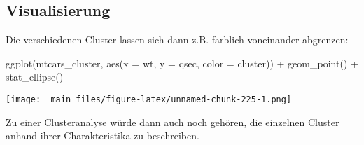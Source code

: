 \documentclass[
  ngerman,
]{article}
\newenvironment{Shaded}{\begin{snugshade}}{\end{snugshade}}
\newcommand{\AttributeTok}[1]{\textcolor[rgb]{0.77,0.63,0.00}{#1}}
\newcommand{\FunctionTok}[1]{\textcolor[rgb]{0.00,0.00,0.00}{#1}}
\newcommand{\NormalTok}[1]{#1}
\newcommand{\SpecialCharTok}[1]{\textcolor[rgb]{0.00,0.00,0.00}{#1}}
\begin{document}
\hypertarget{visualisierung-1}{%
\subsection{Visualisierung}\label{visualisierung-1}}

Die verschiedenen Cluster lassen sich dann z.B. farblich voneinander abgrenzen:

\begin{Shaded}
\begin{Highlighting}[]
\FunctionTok{ggplot}\NormalTok{(mtcars\_cluster, }\FunctionTok{aes}\NormalTok{(}\AttributeTok{x =}\NormalTok{ wt, }\AttributeTok{y =}\NormalTok{ qsec, }\AttributeTok{color =}\NormalTok{ cluster)) }\SpecialCharTok{+}
  \FunctionTok{geom\_point}\NormalTok{() }\SpecialCharTok{+}
  \FunctionTok{stat\_ellipse}\NormalTok{()}
\end{Highlighting}
\end{Shaded}

\texttt{[image: \_main\_files/figure-latex/unnamed-chunk-225-1.png]}

Zu einer Clusteranalyse würde dann auch noch gehören, die einzelnen Cluster anhand ihrer Charakteristika zu beschreiben.
\end{document}
